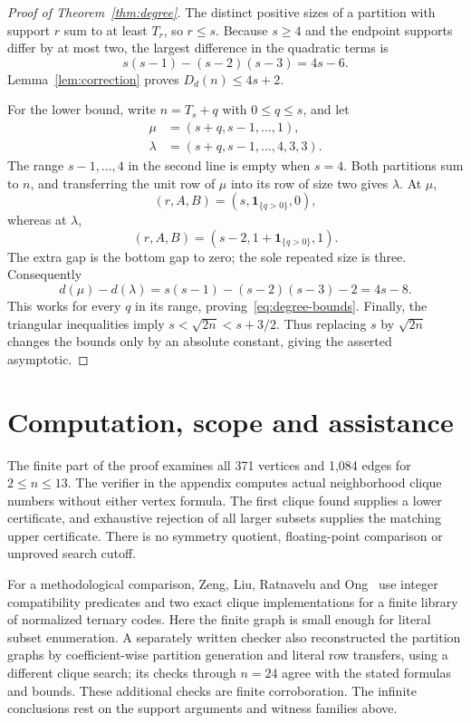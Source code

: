 \documentclass[11pt]{article}
\newcommand{\one}{\mathbf{1}}
\begin{document}
\begin{proof}[Proof of Theorem~\ref{thm:degree}]
The distinct positive sizes of a partition with support $r$ sum to at
least $T_r$, so $r\leq s$. Because $s\geq4$ and the endpoint supports
differ by at most two, the largest difference in the quadratic terms is
\[
 s(s-1)-(s-2)(s-3)=4s-6.
\]
Lemma~\ref{lem:correction} proves $D_d(n)\leq4s+2$.

For the lower bound, write $n=T_s+q$ with $0\leq q\leq s$, and let
\begin{align*}
 \mu&=(s+q,s-1,\ldots,1),\\
 \lambda&=(s+q,s-1,\ldots,4,3,3).
\end{align*}
The range $s-1,\ldots,4$ in the second line is empty when $s=4$.
Both partitions sum to $n$, and transferring the unit row of $\mu$ into
its row of size two gives $\lambda$. At $\mu$,
\[
 (r,A,B)=(s,\one_{\{q>0\}},0),
\]
whereas at $\lambda$,
\[
 (r,A,B)=(s-2,1+\one_{\{q>0\}},1).
\]
The extra gap is the bottom gap to zero; the sole repeated size is three.
Consequently
\[
 d(\mu)-d(\lambda)=s(s-1)-(s-2)(s-3)-2=4s-8.
\]
This works for every $q$ in its range, proving~\eqref{eq:degree-bounds}.
Finally, the triangular inequalities imply
$s<\sqrt{2n}<s+3/2$. Thus replacing $s$ by $\sqrt{2n}$ changes the
bounds only by an absolute constant, giving the asserted asymptotic.
\end{proof}

\section{Computation, scope and assistance}

The finite part of the proof examines all 371 vertices and 1,084 edges
for $2\leq n\leq13$. The verifier in the appendix computes actual
neighborhood clique numbers without either vertex formula. The first clique
found supplies a lower certificate, and exhaustive rejection of all larger
subsets supplies the matching upper certificate. There is no symmetry
quotient, floating-point comparison or unproved search cutoff.

For a methodological comparison, Zeng, Liu, Ratnavelu and
Ong~\cite[Section~4, Lemma~3 and Proposition~1]{ZengFiniteCertificates}
use integer compatibility predicates and two exact clique implementations
for a finite library of normalized ternary codes. Here the finite graph is
small enough for literal subset enumeration. A separately written checker
also reconstructed the partition graphs by coefficient-wise partition
generation and literal row transfers, using a different clique search;
its checks through $n=24$ agree with the stated formulas and bounds.
These additional checks are finite corroboration. The infinite conclusions
rest on the support arguments and witness families above.
\end{document}
